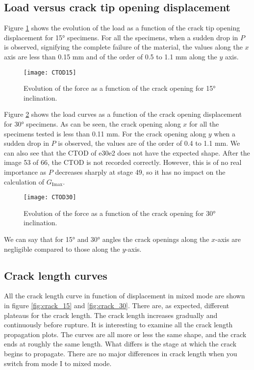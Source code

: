 \subsection{Load versus crack tip opening displacement}

Figure \ref{fig:CTOD15} shows the evolution of the load as a function of the crack tip opening displacement for 15° specimens. For all the specimens, when a sudden drop in $P$ is observed, signifying the complete failure of the material, the values along the $x$ axis are less than 0.15 mm and of the order of 0.5 to 1.1 mm along the $y$ axis.

\begin{figure}[H]
	\centering
	\texttt{[image: CTOD15]}
	\caption{Evolution of the force as a function of the crack opening for 15° inclination.}
	\label{fig:CTOD15}
\end{figure}

Figure \ref{fig:CTOD30} shows the load curves as a function of the crack opening displacement for 30° specimens. As can be seen, the crack opening along $x$ for all the specimens tested is less than 0.11 mm. For the crack opening along $y$ when a sudden drop in $P$ is observed, the values are of the order of 0.4 to 1.1 mm.
We can also see that the CTOD of e30e2 does not have the expected shape. After the image 53 of 66, the CTOD is not recorded correctly. However, this is of no real importance as $P$ decreases sharply at stage 49, so it has no impact on the calculation of $G_\text{Imax}$.

\begin{figure}[H]
	\centering
	\texttt{[image: CTOD30]}
	\caption{Evolution of the force as a function of the crack opening for 30° inclination.}
	\label{fig:CTOD30}
\end{figure}

We can say that for 15° and 30° angles the crack openings along the $x$-axis are negligible compared to those along the $y$-axis.

\subsection{Crack length curves}

All the crack length curve in function of displacement in mixed mode are shown in figure \ref{fig:crack_15} and \ref{fig:crack_30}. 
There are, as expected, different plateaus for the crack length. The crack length increases gradually and continuously before rupture. It is interesting to examine all the crack length propagation plots.  The curves are all more or less the same shape, and the crack ends at roughly the same length. What differs is the stage at which the crack begins to propagate. There are no major differences in crack length when you switch from mode I to mixed mode.

